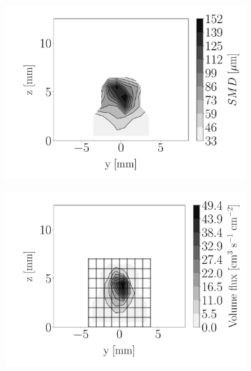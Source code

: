\begin{figure}[h!]
\centering
\begin{subfigure}[b]{0.3\textwidth}
	\centering
   \includegraphics[scale=\scaleSLIJICF]{./part2_developments/figures_ch5_resolved_JICF/injectors_SLI/uG75_dx10_x05_SMD_map}
\end{subfigure}
   \hspace{0.17in}
\begin{subfigure}[b]{0.3\textwidth}
	\centering
   \includegraphics[scale=\scaleSLIJICF]{./part2_developments/figures_ch5_resolved_JICF/injectors_SLI/uG75_dx10_x05_volume_flux_map}
\end{subfigure}

\end{figure}
